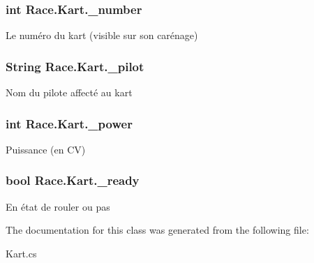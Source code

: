 \hypertarget{class_race_1_1_kart_af7860f4c88d687a5a8d22151592c8974}{}
\subsubsection[{\+\_\+number}]{\setlength{\rightskip}{0pt plus 5cm}int Race.\+Kart.\+\_\+number}\label{class_race_1_1_kart_af7860f4c88d687a5a8d22151592c8974}


Le numéro du kart (visible sur son carénage) 

\hypertarget{class_race_1_1_kart_a95bf9b72640a0f73e19837376861184f}{}
\subsubsection[{\+\_\+pilot}]{\setlength{\rightskip}{0pt plus 5cm}String Race.\+Kart.\+\_\+pilot}\label{class_race_1_1_kart_a95bf9b72640a0f73e19837376861184f}


Nom du pilote affecté au kart 

\hypertarget{class_race_1_1_kart_a2e90dc684349a0ccd2de96b1faefd043}{}
\subsubsection[{\+\_\+power}]{\setlength{\rightskip}{0pt plus 5cm}int Race.\+Kart.\+\_\+power}\label{class_race_1_1_kart_a2e90dc684349a0ccd2de96b1faefd043}


Puissance (en C\+V) 

\hypertarget{class_race_1_1_kart_ae491a61fdfac43fb31a83c85c316d13a}{}
\subsubsection[{\+\_\+ready}]{\setlength{\rightskip}{0pt plus 5cm}bool Race.\+Kart.\+\_\+ready}\label{class_race_1_1_kart_ae491a61fdfac43fb31a83c85c316d13a}


En état de rouler ou pas 



The documentation for this class was generated from the following file\+:\begin{DoxyCompactItemize}
\item 
Kart.\+cs\end{DoxyCompactItemize}
